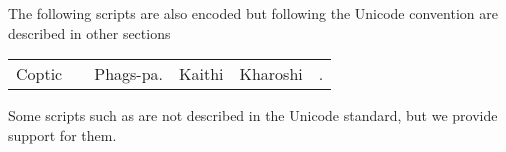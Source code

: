 The following scripts are also encoded but following the Unicode
convention are described in other sections

\begin{center}
\begin{tabular}{llllll}
Coptic &\nameref{s:glagolitic} &Phags-pa. &Kaithi &Kharoshi &\nameref{s:brahmi}.\\
\end{tabular}
\end{center}

Some scripts such as  are not described in the Unicode standard, but we provide support for them.

















%















\ifscriptolmec
  
\fi
